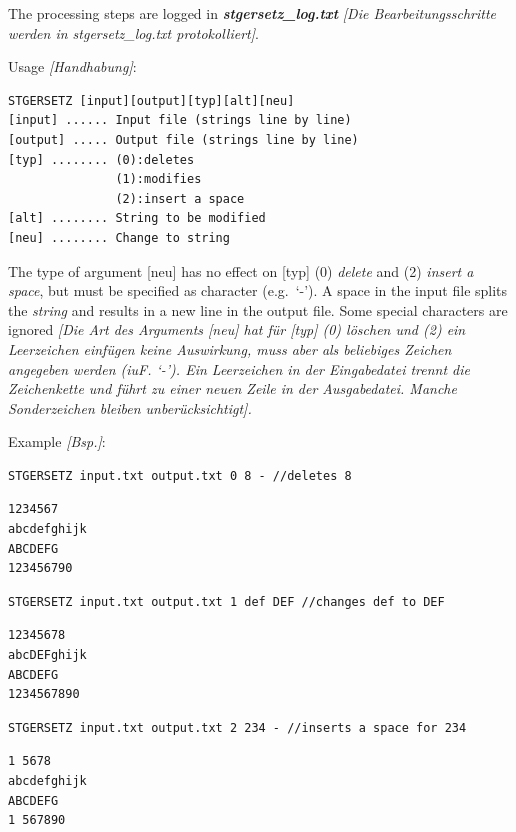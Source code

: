 \documentclass[
]{article}
\begin{document}
The processing steps are logged in \textbf{\emph{stgersetz\_log.txt}}
\emph{{[}Die Bearbeitungsschritte werden in stgersetz\_log.txt
protokolliert{]}}.

Usage \emph{{[}Handhabung{]}}:

\begin{verbatim}
STGERSETZ [input][output][typ][alt][neu]
[input] ...... Input file (strings line by line)
[output] ..... Output file (strings line by line)
[typ] ........ (0):deletes
               (1):modifies
               (2):insert a space
[alt] ........ String to be modified
[neu] ........ Change to string
\end{verbatim}

The type of argument {[}neu{]} has no effect on {[}typ{]} (0)
\emph{delete} and (2) \emph{insert a space}, but must be specified as
character (e.g.~`-'). A space in the input file splits the \emph{string}
and results in a new line in the output file. Some special characters
are ignored \emph{{[}Die Art des Arguments {[}neu{]} hat für {[}typ{]}
(0) löschen und (2) ein Leerzeichen einfügen keine Auswirkung, muss aber
als beliebiges Zeichen angegeben werden (iuF. `-'). Ein Leerzeichen in
der Eingabedatei trennt die Zeichenkette und führt zu einer neuen Zeile
in der Ausgabedatei. Manche Sonderzeichen bleiben unberücksichtigt{]}.}

Example \emph{{[}Bsp.{]}}:

\begin{verbatim}
STGERSETZ input.txt output.txt 0 8 - //deletes 8
\end{verbatim}

\begin{verbatim}
1234567
abcdefghijk
ABCDEFG
123456790
\end{verbatim}

\begin{verbatim}
STGERSETZ input.txt output.txt 1 def DEF //changes def to DEF
\end{verbatim}

\begin{verbatim}
12345678
abcDEFghijk
ABCDEFG
1234567890
\end{verbatim}

\begin{verbatim}
STGERSETZ input.txt output.txt 2 234 - //inserts a space for 234
\end{verbatim}

\begin{verbatim}
1 5678
abcdefghijk
ABCDEFG
1 567890
\end{verbatim}
\end{document}
